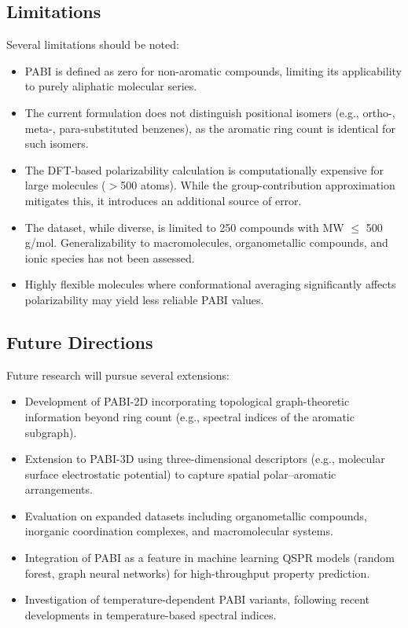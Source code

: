 \documentclass[12pt,a4paper]{article}
\begin{document}
\subsection{Limitations}

Several limitations should be noted:

\begin{itemize}[leftmargin=2em]
\item PABI is defined as zero for non-aromatic compounds, limiting its applicability to purely aliphatic molecular series.
\item The current formulation does not distinguish positional isomers (e.g., ortho-, meta-, para-substituted benzenes), as the aromatic ring count is identical for such isomers.
\item The DFT-based polarizability calculation is computationally expensive for large molecules ($>$500 atoms). While the group-contribution approximation mitigates this, it introduces an additional source of error.
\item The dataset, while diverse, is limited to 250 compounds with MW $\leq$ 500 g/mol. Generalizability to macromolecules, organometallic compounds, and ionic species has not been assessed.
\item Highly flexible molecules where conformational averaging significantly affects polarizability may yield less reliable PABI values.
\end{itemize}

\subsection{Future Directions}

Future research will pursue several extensions:

\begin{itemize}[leftmargin=2em]
\item Development of PABI-2D incorporating topological graph-theoretic information beyond ring count (e.g., spectral indices of the aromatic subgraph).
\item Extension to PABI-3D using three-dimensional descriptors (e.g., molecular surface electrostatic potential) to capture spatial polar--aromatic arrangements.
\item Evaluation on expanded datasets including organometallic compounds, inorganic coordination complexes, and macromolecular systems.
\item Integration of PABI as a feature in machine learning QSPR models (random forest, graph neural networks) for high-throughput property prediction.
\item Investigation of temperature-dependent PABI variants, following recent developments in temperature-based spectral indices\cite{hayat2026novel, hayat2024novel, kulli2019computation}.
\end{itemize}
\end{document}

